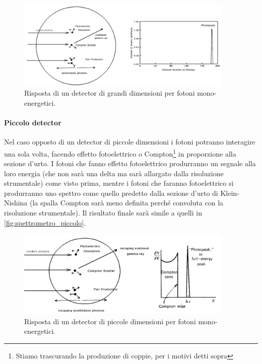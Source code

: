  \begin{figure}[h]
 	\centering
 	\includegraphics[width=28em]{spettrometro_grosso}
 	\caption{\label{fig:spettrometro_grsso}Risposta di un detector di grandi dimensioni per fotoni mono-energetici.}
 \end{figure}

 \paragraph{Piccolo detector}Nel caso opposto di un detector di piccole dimensioni i fotoni potranno interagire una sola volta, facendo effetto fotoelettrico o Compton\footnote{Stiamo trascurando la produzione di coppie, per i motivi detti sopra} in proporzione alla sezione d'urto. I fotoni che fanno effetto fotoelettrico produrranno un segnale alla loro energia (che non sarà una delta ma sarà allargato dalla risoluzione strumentale) come visto prima, mentre i fotoni che faranno fotoelettrico si produrranno uno spettro come quello predetto dalla sezione d'urto di Klein-Nishina (la spalla Compton sarà meno definita perché convoluta con la risoluzione strumentale). Il risultato finale sarà simile a quelli in \autoref{fig:spettrometro_piccolo}.
 
  \begin{figure}[h]
 	\centering
 	\includegraphics[width=28em]{spettrometro_piccolo}
 	\caption{\label{fig:spettrometro_piccolo}Risposta di un detector di piccole dimensioni per fotoni mono-energetici.}
 \end{figure}
 
